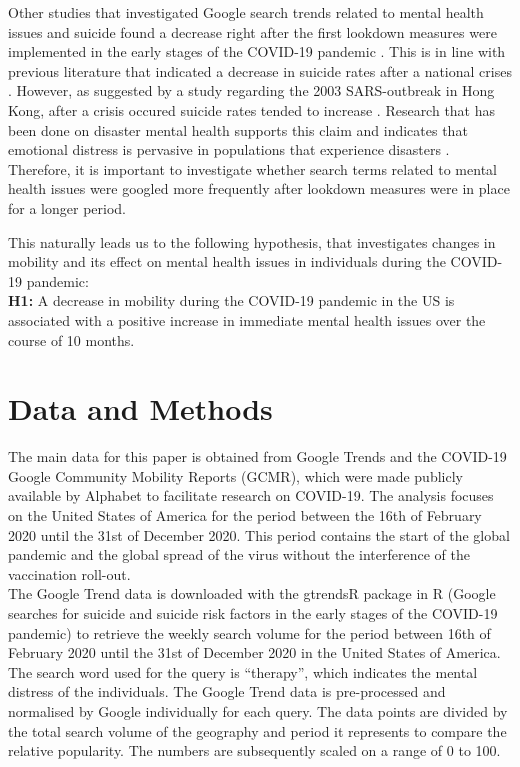 Other studies that investigated Google search trends related to mental health issues and suicide found a decrease right after the first lookdown measures were implemented in the early stages of the COVID-19 pandemic \citep{Halford2020}. This is in line with previous literature that indicated a decrease in suicide rates after a national crises \citep{claassen_carmody_stewart_bossarte_larkin_woodward_trivedi_2010}. However, as suggested by a study regarding the 2003 SARS-outbreak in Hong Kong, after a crisis occured suicide rates tended to increase \citep{Cheung_Chau_Yip2008}. Research that has been done on disaster mental health supports this claim and indicates that emotional distress is pervasive in populations that experience disasters \citep{Pfefferbaum2020}. Therefore, it is important to investigate whether search terms related to mental health issues were googled more frequently after lookdown measures were in place for a longer period. 

This naturally leads us to the following hypothesis, that investigates changes in mobility and its effect on mental health issues in individuals during the COVID-19 pandemic: \\

\textbf{H1:} A decrease in mobility during the COVID-19 pandemic in the US is associated with a positive increase in immediate mental health issues over the course of 10 months. 




\section{Data and Methods}
\noindent


The main data for this paper is obtained from Google Trends and the COVID-19 Google Community Mobility Reports (GCMR), which were made publicly available by Alphabet to facilitate research on COVID-19. The analysis focuses on the United States of America for the period between the 16th of February 2020 until the 31st of December 2020. This period contains the start of the global pandemic and the global spread of the virus without the interference of the vaccination roll-out.\\

The Google Trend data is downloaded with the gtrendsR package in R (Google searches for suicide and suicide risk factors in the early stages of the COVID-19 pandemic) to retrieve the weekly search volume for the period between 16th of February 2020 until the 31st of December 2020 in the United States of America. The search word used for the query is “therapy”, which indicates the mental distress of the individuals. The Google Trend data is pre-processed and normalised by Google individually for each query. The data points are divided by the total search volume of the geography and period it represents to compare the relative popularity. The numbers are subsequently scaled on a range of 0 to 100.\\

